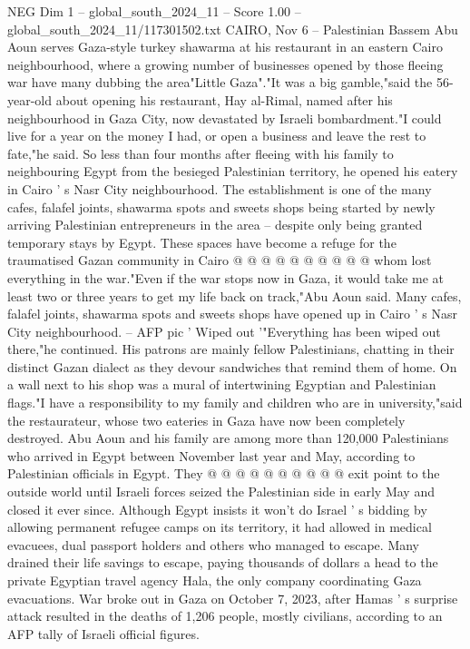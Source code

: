 \begin{textsample}{NEG Dim 1 – global\_south\_2024\_11 – Score 1.00 – global\_south\_2024\_11/117301502.txt}  \label{ex:f1_neg_285}
CAIRO, Nov 6 -- Palestinian Bassem Abu Aoun serves Gaza-style turkey shawarma at his restaurant in an eastern Cairo neighbourhood, where a growing number of businesses opened by those fleeing war have many dubbing the area"Little Gaza"."It was a big gamble,"said the 56-year-old about opening his restaurant, Hay al-Rimal, named after his neighbourhood in Gaza City, now devastated by Israeli bombardment."I could live for a year on the money I had, or open a business and leave the rest to fate,"he said.
So less than four months after fleeing with his family to neighbouring Egypt from the besieged Palestinian territory, he opened his eatery in Cairo ' s Nasr City neighbourhood.
The establishment is one of the many cafes, falafel joints, shawarma spots and sweets shops being started by newly arriving Palestinian entrepreneurs in the area -- despite only being granted temporary stays by Egypt.
These spaces have become a refuge for the traumatised Gazan community in Cairo @ @ @ @ @ @ @ @ @ @ whom lost everything in the war."Even if the war stops now in Gaza, it would take me at least two or three years to get my life back on track,"Abu Aoun said.
Many cafes, falafel joints, shawarma spots and sweets shops have opened up in Cairo ' s Nasr City neighbourhood. -- AFP pic ' Wiped out '"Everything has been wiped out there,"he continued.
His patrons are mainly fellow Palestinians, chatting in their distinct Gazan dialect as they devour sandwiches that remind them of home.
On a wall next to his shop was a mural of intertwining Egyptian and Palestinian flags."I have a responsibility to my family and children who are in university,"said the restaurateur, whose two eateries in Gaza have now been completely destroyed.
Abu Aoun and his family are among more than 120,000 Palestinians who arrived in Egypt between November last year and May, according to Palestinian officials in Egypt.
They @ @ @ @ @ @ @ @ @ @ exit point to the outside world until Israeli forces seized the Palestinian side in early May and closed it ever since.
Although Egypt insists it won't do Israel ' s bidding by allowing permanent refugee camps on its territory, it had allowed in medical evacuees, dual passport holders and others who managed to escape.
Many drained their life savings to escape, paying thousands of dollars a head to the private Egyptian travel agency Hala, the only company coordinating Gaza evacuations.
War broke out in Gaza on October 7, 2023, after Hamas ' s surprise attack resulted in the deaths of 1,206 people, mostly civilians, according to an AFP tally of Israeli official figures.

\end{textsample}

